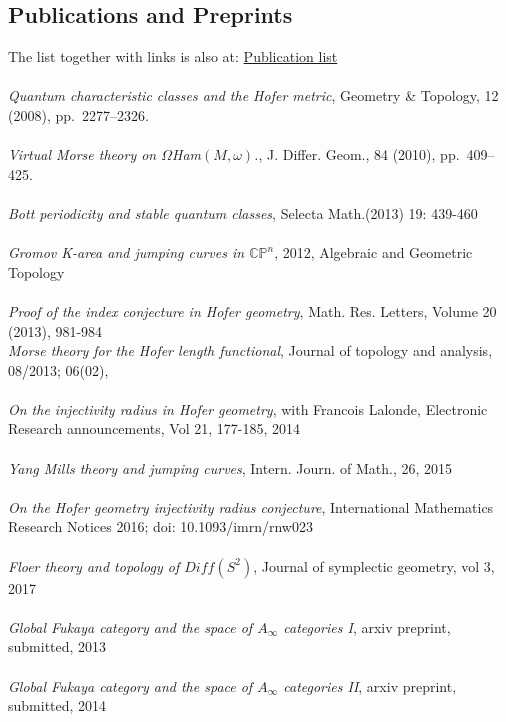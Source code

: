 \documentclass[overlapped,line,letterpaper]{res}
\begin{document}
\begin{resume}
\section {\sc Publications and Preprints} 
The list together with links is also at:
   \href{http://yashamon.github.io/web2/}{Publication list} \\\\
{\em {Quantum characteristic classes
and the Hofer metric}}, Geometry \& Topology, 12 (2008), pp.~2277--2326.\\\\
{\em {Virtual Morse
  theory on $\Omega $Ham$(M, \omega)$.}}, J. Differ. Geom., 84 (2010),
  pp.~409--425.\\\\ 
{\em{Bott periodicity and stable
quantum classes}}, Selecta Math.(2013) 19: 439-460\\\\ 
 {\em{Gromov K-area and jumping
curves in $ \mathbb{CP} ^{n}$}}, 2012, Algebraic and Geometric Topology \\\\
 {\em {Proof
of the index conjecture in Hofer geometry}}, Math. Res. Letters, Volume 20
(2013), 981-984 \\
\emph{Morse theory for the Hofer length functional}, Journal of topology and
analysis, 08/2013; 06(02), \\\\
{\em {On the injectivity radius in Hofer geometry}}, with Francois Lalonde, 
Electronic Research announcements, Vol 21, 177-185, 2014 \\\\
\emph {Yang Mills theory and jumping curves}, Intern. Journ. of Math.,
26,
2015 \\\\ 
\emph {On the Hofer geometry injectivity radius conjecture}, International Mathematics Research Notices 2016; doi: 10.1093/imrn/rnw023 \\\\
\emph {Floer theory and topology of $Diff (S ^{2} )$},  Journal of symplectic
geometry, vol 3, 2017 \\\\
\emph{Global Fukaya category and the space of $A _{\infty} $
categories I},  arxiv preprint, submitted, 2013 \\\\
\emph {Global Fukaya category and the space of $A _{\infty} $
categories II},  arxiv preprint, submitted, 2014 \\\\

\end{resume}
\end{document}
